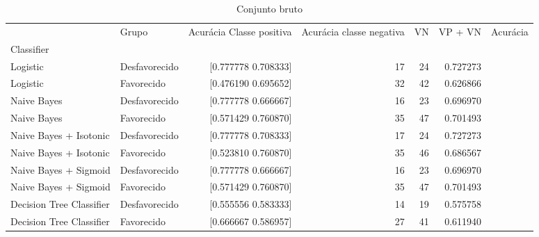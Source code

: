 \begin{table}
    \centering
    \caption{Conjunto bruto}
    \label{Conjunto bruto 3}
    \begin{tabular}{llrrrrr}
    \toprule
    {} &          Grupo &  Acurácia Classe positiva &  Acurácia classe negativa &  VN  &  VP + VN  &  Acurácia \\
    Classifier               &                &                           &                           &      &           &           \\
    \midrule
    Logistic                 &  Desfavorecido &                  [0.777778  0.708333] &   17 &        24 &  0.727273 \\
    Logistic                 &     Favorecido &                  [0.476190  0.695652] &   32 &        42 &  0.626866 \\
    Naive Bayes              &  Desfavorecido &                  [0.777778  0.666667] &   16 &        23 &  0.696970 \\
    Naive Bayes              &     Favorecido &                  [0.571429  0.760870] &   35 &        47 &  0.701493 \\
    Naive Bayes + Isotonic   &  Desfavorecido &                  [0.777778  0.708333] &   17 &        24 &  0.727273 \\
    Naive Bayes + Isotonic   &     Favorecido &                  [0.523810  0.760870] &   35 &        46 &  0.686567 \\
    Naive Bayes + Sigmoid    &  Desfavorecido &                  [0.777778  0.666667] &   16 &        23 &  0.696970 \\
    Naive Bayes + Sigmoid    &     Favorecido &                  [0.571429  0.760870] &   35 &        47 &  0.701493 \\
    Decision Tree Classifier &  Desfavorecido &                  [0.555556  0.583333] &   14 &        19 &  0.575758 \\
    Decision Tree Classifier &     Favorecido &                  [0.666667  0.586957] &   27 &        41 &  0.611940 \\
    \bottomrule
    \end{tabular}
\end{table}


